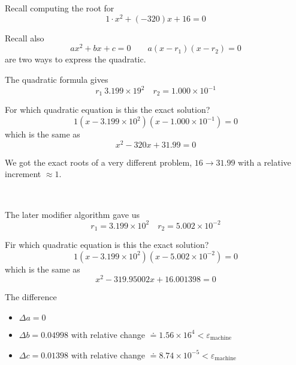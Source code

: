 \begin{example}
    \setlength{\parindent}{0pt}

    Recall computing the root for \[
        1 \cdot x^2 + (-320)x + 16 = 0
    \]

    Recall also \[
        ax^2 + bx + c = 0 \qquad a(x - r_1)(x - r_2) = 0
    \] are two ways to express the quadratic.

    The quadratic formula gives \[
        r_1 \ 3.199 \times 19^2 \quad r_2 = 1.000 \times 10^{-1}
    \]

    For which quadratic equation is this the exact solution? \[
        1(x - 3.199 \times 10^2)(x - 1.000 \times 10^{-1}) = 0
    \] which is the same as \[
        x^2 - 320x + 31.99 = 0
    \]

    We got the exact roots of a very different problem, \( 16 \to 31.99 \) with a relative increment \( \approx 1 \).

        {~~~}

    The later modifier algorithm gave us \[
        r_1 = 3.199 \times 10^2 \quad r_2 = 5.002 \times 10^{-2}
    \]

    Fir which quadratic equation is this the exact solution? \[
        1(x - 3.199 \times 10^2)(x - 5.002 \times 10^{-2}) = 0
    \] which is the same as \[
        x^2 - 319.95002x + 16.001398 = 0
    \]

    The difference
    \begin{itemize}
        \item \( \Delta a = 0 \)
        \item \( \Delta b = 0.04998 \) with relative change \( \doteq 1.56 \times 16^4 < \varepsilon_{\text{machine}} \)
        \item \( \Delta c = 0.01398 \) with relative change \( \doteq 8.74 \times 10^{-5} < \varepsilon_{\text{machine}} \)
    \end{itemize}
\end{example}